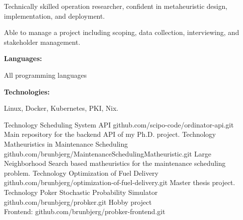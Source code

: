 \documentclass[9pt]{developercv} %
\begin{document}
\begin{minipage}[t]{0.46\textwidth}
	\vspace{-6pt}

 	Technically skilled operation researcher, confident in metaheuristic design, implementation, and deployment.

	Able to manage a project including scoping, data collection, interviewing, and stakeholder management.

\end{minipage}
\hfill %
\begin{minipage}[t]{0.465\textwidth}
    \vspace{-6pt}
    
    \begin{minipage}[t]{0.2\textwidth}
        \textbf{Languages:}
    \end{minipage}
    \hfill
    \begin{minipage}[t]{0.73\textwidth}
	  All programming languages
    \end{minipage}
    \vspace{4mm}
    
    \begin{minipage}[t]{0.2\textwidth}
        \textbf{Technologies:}
    \end{minipage}
    \hfill
    \begin{minipage}[t]{0.73\textwidth}
    	Linux, Docker, Kubernetes, PKI, Nix.
    \end{minipage}
    
\end{minipage}

\begin{entrylist}
    \entry
		{Technology}
		{Scheduling System API}
		{github.com/scipo-code/ordinator-api.git}
		{
        	Main repository for the backend API of my Ph.D. project.
		}
	\entry
		{Technology}
		{Matheuristics in Maintenance Scheduling}
		{github.com/brunbjerg/MaintenanceSchedulingMatheuristic.git}
		{ 
			Large Neighborhood Search based matheuristics for the maintenance scheduling problem.
		}
    \entry
		{Technology}
		{Optimization of Fuel Delivery}
		{github.com/brunbjerg/optimization-of-fuel-delivery.git}
		{ 
			Master thesis project. 
		}
    \entry
		{Technology}
		{Poker Stochastic Probability Simulator}
		{
			github.com/brunbjerg/probker.git
		}
		{ 
			Hobby project \\ 
			Frontend: github.com/brunbjerg/probker-frontend.git
		}
\end{entrylist}
\end{document}
